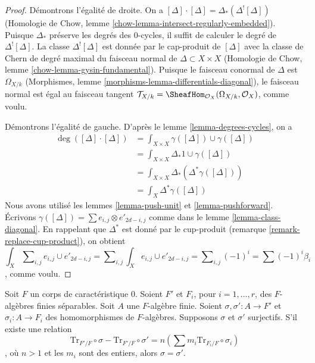 \begin{proof}
Démontrons l'égalité de droite. On a
$[\Delta] \cdot [\Delta] = \Delta_*(\Delta^![\Delta])$
(Homologie de Chow, lemme \ref{chow-lemma-intersect-regularly-embedded}).
Puisque $\Delta_*$ préserve les degrés des $0$-cycles, il suffit de calculer
le degré de $\Delta^![\Delta]$. La classe $\Delta^![\Delta]$ est donnée
par le cap-produit de $[\Delta]$ avec
la classe de Chern de degré maximal du faisceau normal de $\Delta \subset X \times X$
(Homologie de Chow, lemme \ref{chow-lemma-gysin-fundamental}).
Puisque le faisceau conormal de $\Delta$ est $\Omega_{X/k}$
(Morphismes, lemme \ref{morphisms-lemma-differentials-diagonal}),
le faisceau normal est égal au faisceau tangent
$\mathcal{T}_{X/k} = \SheafHom_{\mathcal{O}_X}(\Omega_{X/k}, \mathcal{O}_X)$,
comme voulu.

\medskip\noindent
Démontrons l'égalité de gauche. D'après le lemme \ref{lemma-degrees-cycles}, on a
\begin{align*}
\deg([\Delta] \cdot [\Delta])
& =
\int_{X \times X} \gamma([\Delta]) \cup \gamma([\Delta]) \\
& =
\int_{X \times X} \Delta_*1 \cup \gamma([\Delta]) \\
& =
\int_{X \times X} \Delta_*(\Delta^*\gamma([\Delta])) \\
& =
\int_X \Delta^*\gamma([\Delta])
\end{align*}
Nous avons utilisé les lemmes \ref{lemma-push-unit} et
\ref{lemma-pushforward}.
Écrivons $\gamma([\Delta]) = \sum  e_{i, j} \otimes e'_{2d - i , j}$
comme dans le lemme \ref{lemma-class-diagonal}.
En rappelant que $\Delta^*$ est donné par le cup-produit
(remarque \ref{remark-replace-cup-product}), on obtient
$$
\int_X \sum\nolimits_{i, j} e_{i, j} \cup e'_{2d - i, j} =
\sum\nolimits_{i, j} \int_X e_{i, j} \cup e'_{2d - i, j} =
\sum\nolimits_{i, j} (-1)^i = \sum (-1)^i\beta_i
$$,
comme voulu.
\end{proof}

\begin{lemma}
\label{lemma-algebra-relations}
Soit $F$ un corps de caractéristique $0$.
Soient $F'$ et $F_i$, pour $i = 1, \ldots, r$,
des $F$-algèbres finies séparables. Soit $A$ une $F$-algèbre finie.
Soient $\sigma, \sigma' : A \to F'$ et $\sigma_i : A \to F_i$
des homomorphismes de $F$-algèbres. Supposons $\sigma$ et $\sigma'$ surjectifs.
S'il existe une relation
$$
\text{Tr}_{F'/F} \circ \sigma - \text{Tr}_{F'/F} \circ \sigma' =
n(\sum m_i \text{Tr}_{F_i/F} \circ \sigma_i)
$$,
où $n > 1$ et les $m_i$ sont des entiers, alors $\sigma = \sigma'$.
\end{lemma}

